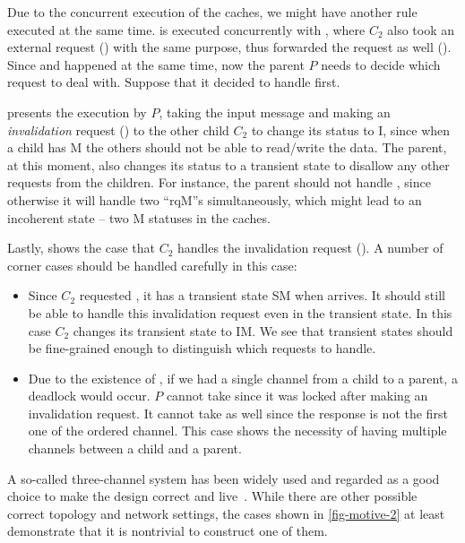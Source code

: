 \documentclass[sigplan,10pt,review,anonymous,screen]{acmart}\settopmatter{printfolios=true,printccs=false,printacmref=false}
\begin{document}
Due to the concurrent execution of the caches, we might have another rule executed at the same time.
 is executed concurrently with , where $C_2$ also took an external request () with the same purpose, thus forwarded the request as well ().
Since  and  happened at the same time, now the parent $P$ needs to decide which request to deal with.
Suppose that it decided to handle  first.

 presents the execution by $P$, taking the input message  and making an \emph{invalidation} request () to the other child $C_2$ to change its status to I, since when a child has M the others should not be able to read/write the data.
The parent, at this moment, also changes its status to a transient state to disallow any other requests from the children.
For instance, the parent should not handle , since otherwise it will handle two {\sf\small ``rqM''}s simultaneously, which might lead to an incoherent state -- two M statuses in the caches.

Lastly,  shows the case that $C_2$ handles the invalidation request ().
A number of corner cases should be handled carefully in this case:
\begin{itemize}[leftmargin=*]
\item Since $C_2$ requested , it has a transient state SM when  arrives. It should still be able to handle this invalidation request even in the transient state. In this case $C_2$ changes its transient state to IM. We see that transient states should be fine-grained enough to distinguish which requests to handle.
\item Due to the existence of , if we had a single channel from a child to a parent, a deadlock would occur. $P$ cannot take  since it was locked after making an invalidation request. It cannot take  as well since the response is not the first one of the ordered channel. This case shows the necessity of having multiple channels between a child and a parent.
\end{itemize}

A so-called three-channel system has been widely used and regarded as a good choice to make the design correct and live~\cite{Murali:2015,thesis:Murali:2016}.
While there are other possible correct topology and network settings, the cases shown in \autoref{fig-motive-2} at least demonstrate that it is nontrivial to construct one of them.
\end{document}
